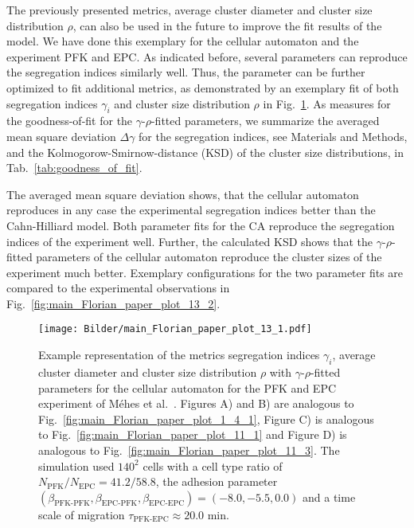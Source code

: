 \documentclass[10pt,letterpaper]{article}
\newcommand{\figref}[1]{Fig.~\ref{fig:#1}}
\newcommand{\tabref}[1]{Tab.~\ref{tab:#1}}
\begin{document}
The previously presented metrics, average cluster diameter and cluster size
distribution $\rho$, can also be used in the future to improve the fit results of
the model. We have done this exemplary for the cellular automaton and the
experiment PFK and EPC. As indicated before, several parameters can
reproduce the segregation indices similarly well. Thus, the parameter can be
further optimized to fit additional metrics, as demonstrated by an exemplary fit
of both segregation indices $\gamma_i$ and cluster size distribution $\rho$
in \figref{main_Florian_paper_plot_13_1}. As measures for the
goodness-of-fit for the $\gamma$-$\rho$-fitted parameters, we summarize the
averaged mean square deviation $\Delta\gamma$ for the segregation indices,
see Materials and Methods, and the Kolmogorow-Smirnow-distance (KSD) of the cluster
size distributions, in \tabref{goodness_of_fit}.

The averaged mean square deviation shows, that the cellular automaton reproduces
in any case the experimental segregation indices better than the Cahn-Hilliard
model. Both parameter fits for the CA  reproduce the segregation indices of the
experiment well. Further, the calculated KSD shows that the
$\gamma$-$\rho$-fitted parameters of the cellular automaton reproduce the cluster
sizes of the experiment much better. Exemplary configurations for the two
parameter fits are compared to the experimental observations in
\figref{main_Florian_paper_plot_13_2}.

\begin{figure}[ht!]
 \centering
 \hspace*{-2cm}
 \texttt{[image: Bilder/main\_Florian\_paper\_plot\_13\_1.pdf]}
 \caption{Example representation of the metrics segregation indices $\gamma_i$,
 average cluster diameter and cluster size distribution $\rho$ with $\gamma$-$\rho$-fitted
 parameters for the cellular automaton for the PFK and EPC experiment of Méhes
 et al.~\cite{MehMonNemVic2012}. Figures A) and B) are analogous to
 \figref{main_Florian_paper_plot_1_4_1}, Figure C) is analogous to
 \figref{main_Florian_paper_plot_11_1} and Figure D) is analogous to
 \figref{main_Florian_paper_plot_11_3}. The simulation used $140^2$ cells with
 a cell type ratio of $N_\text{PFK}/N_\text{EPC}=41.2/58.8$, the adhesion parameter
 $(\beta_\text{PFK-PFK},\beta_\text{EPC-PFK},\beta_\text{EPC-EPC})=(-8.0,-5.5,0.0)$
 and a time scale of migration $\tau_\text{PFK-EPC}\approx20.0$ min.}
 \label{fig:main_Florian_paper_plot_13_1}
\end{figure}
\end{document}
